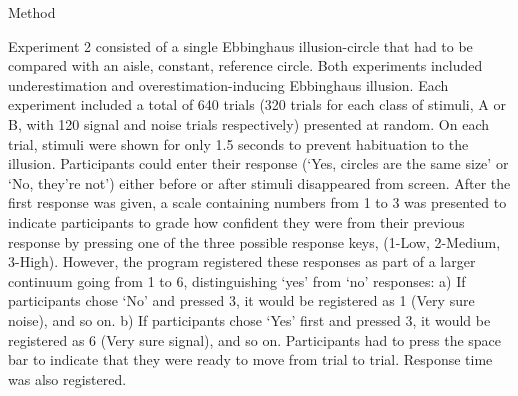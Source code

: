 \documentclass[final]{beamer}
\newlength{\onecolwid}
\newlength{\twocolwid}
\begin{document}
\begin{frame}[t]
\begin{columns}[t]
\begin{column}{\twocolwid}
\begin{columns}[t,totalwidth=\twocolwid]
\begin{column}{\onecolwid}
\begin{block}{Method}
%


Experiment 2 consisted of a single Ebbinghaus illusion-circle that had to be compared with an aisle, constant, reference circle. Both experiments included underestimation and overestimation-inducing Ebbinghaus illusion.
Each experiment included a total of 640 trials (320 trials for each class of stimuli, A or B, with 120 signal and noise trials respectively) presented at random. On each trial, stimuli were shown for only 1.5 seconds to prevent habituation to the illusion. Participants could enter their response (‘Yes, circles are the same size’ or ‘No, they’re not’) either before or after stimuli disappeared from screen.
After the first response was given, a scale containing numbers from 1 to 3 was presented to indicate participants to grade how confident they were from their previous response by pressing one of the three possible response keys, (1-Low, 2-Medium, 3-High). However, the program registered these responses as part of a larger continuum going from 1 to 6, distinguishing ‘yes’ from ‘no’ responses:
a) If participants chose ‘No’ and pressed 3, it would be registered as 1 (Very sure noise), and so on.
b) If participants chose ‘Yes’ first and pressed 3, it would be registered as 6 (Very sure signal), and so on.
Participants had to press the space bar to indicate that they were ready to move from trial to trial. Response time was also registered.




\end{block}
\end{column}
\end{columns}
\end{column}
\end{columns}
\end{frame}
\end{document}
